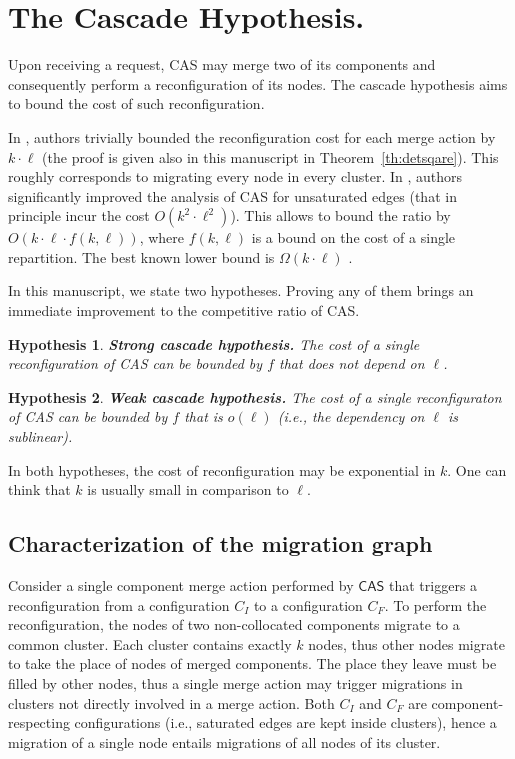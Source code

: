 \documentclass[a4paper,anonymous,USenglish]{lipics-v2019}
\newcommand{\DET}{\textsf{CAS}\xspace}
\newcommand{\TAlg}{{\ensuremath{\textsf{CAS}}}\xspace}
\newtheorem{hypothesis}{Hypothesis}
\begin{document}
\section{The Cascade Hypothesis.}

Upon receiving a request, \DET may merge two of its components and consequently perform a
reconfiguration of its nodes.
The cascade hypothesis aims to bound the cost of such reconfiguration.

In \cite{repartition-disc}, authors trivially bounded the reconfiguration cost
for each merge action by $k \cdot \ell$ (the proof is given also in this
manuscript in Theorem~\ref{th:detsqare}).
This roughly corresponds to migrating every node in every cluster.
In \cite{disc2020}, authors significantly improved the analysis of \DET for
unsaturated edges (that in principle incur the cost $O(k^2\cdot \ell^2)$).
This allows to bound the ratio by $O(k\cdot \ell \cdot f(k, \ell))$, where $f(k,
\ell)$ is a bound on the cost of a single repartition.
The best known lower bound is $\Omega(k\cdot \ell)$ \cite{disc2020}.

\medskip

In this manuscript, we state two hypotheses. Proving any of them brings an
immediate improvement to the competitive ratio of \DET.

\begin{hypothesis}\textbf{Strong cascade hypothesis.} The cost of a single
reconfiguration of \DET can be bounded by $f$ that does not depend on $\ell$.
\end{hypothesis}

\begin{hypothesis}
    \textbf{Weak cascade hypothesis.}
The cost of a single reconfiguraton of \DET can be bounded by $f$ that is $o(\ell)$ (i.e., the dependency on $\ell$ is
sublinear).
\end{hypothesis}

In both hypotheses, the cost of reconfiguration may be exponential in $k$.
One can think that $k$ is usually small in comparison to $\ell$.


\subsection{Characterization of the migration graph}

Consider a single component merge action performed by \TAlg that triggers a reconfiguration from a configuration $C_I$ to a configuration $C_F$.
To perform the reconfiguration, the nodes of two non-collocated components migrate to a common cluster.
Each cluster contains exactly $k$ nodes, thus other nodes migrate to take the place of nodes of merged components.
The place they leave must be filled by other nodes, thus a single merge action may trigger migrations in clusters not directly involved in a merge action. 
Both $C_I$ and $C_F$ are component-respecting configurations (i.e., saturated
edges are kept inside clusters), hence a migration of a single node entails migrations of all nodes of its cluster.
\end{document}
